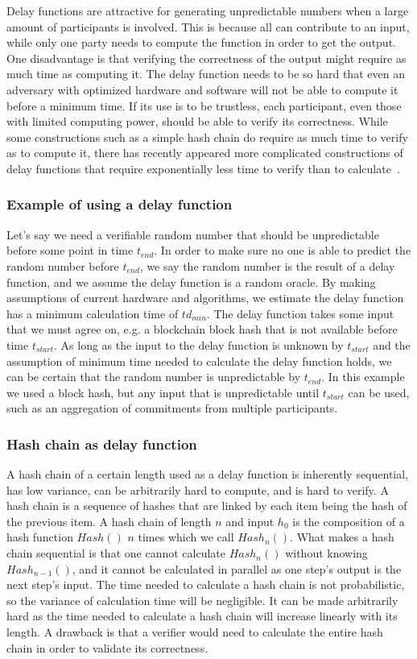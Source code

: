 Delay functions are attractive for generating unpredictable numbers when a large amount of participants is involved. This is because all can contribute to an input, while only one party needs to compute the function in order to get the output. One disadvantage is that verifying the correctness of the output might require as much time as computing it. The delay function needs to be so hard that even an adversary with optimized hardware and software will not be able to compute it before a minimum time. If its use is to be trustless, each participant, even those with limited computing power, should be able to verify its correctness. While some constructions such as a simple hash chain do require as much time to verify as to compute it, there has recently appeared more complicated constructions of delay functions that require exponentially less time to verify than to calculate~\cite{boneh_verifiable_2018}.

\subsubsection{Example of using a delay function}
Let's say we need a verifiable random number that should be unpredictable before some point in time $t_{end}$. In order to make sure no one is able to predict the random number before $t_{end}$, we say the random number is the result of a delay function, and we assume the delay function is a random oracle. By making assumptions of current hardware and algorithms, we estimate the delay function has a minimum calculation time of $td_{min}$. The delay function takes some input that we must agree on, e.g. a blockchain block hash that is not available before time $t_{start}$. As long as the input to the delay function is unknown by $t_{start}$ and the assumption of minimum time needed to calculate the delay function holds, we can be certain that the random number is unpredictable by $t_{end}$. In this example we used a block hash, but any input that is unpredictable until $t_{start}$ can be used, such as an aggregation of commitments from multiple participants.

\subsubsection{Hash chain as delay function}
A hash chain of a certain length used as a delay function is inherently sequential, has low variance, can be arbitrarily hard to compute, and is hard to verify. A hash chain is a sequence of hashes that are linked by each item being the hash of the previous item. A hash chain of length $n$ and input $h_0$ is the composition of a hash function $Hash()$ $n$ times which we call $Hash_n()$. What makes a hash chain sequential is that one cannot calculate $Hash_n()$ without knowing $Hash_{n-1}()$, and it cannot be calculated in parallel as one step's output is the next step's input. The time needed to calculate a hash chain is not probabilistic, so the variance of calculation time will be negligible. It can be made arbitrarily hard as the time needed to calculate a hash chain will increase linearly with its length. A drawback is that a verifier would need to calculate the entire hash chain in order to validate its correctness. 

